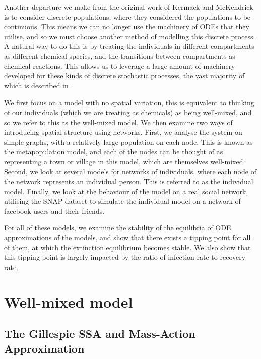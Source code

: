 \documentclass[12pt,a4paper,openany,twoside]{book}
\begin{document}
Another departure we make from the original work of Kermack and McKendrick is to consider discrete populations, where they considered the populations to be continuous. This means we can no longer use the machinery of ODEs that they utilise, and so we must choose another method of modelling this discrete process. A natural way to do this is by treating the individuals in different compartments as different chemical species, and the transitions between compartments as chemical reactions. This allows us to leverage a large amount of machinery developed for these kinds of discrete stochastic processes, the vast majority of which is described in \citet{erbanStochasticModellingReaction2019}.

We first focus on a model with no spatial variation, this is equivalent to thinking of our individuals (which we are treating as chemicals) as being well-mixed, and so we refer to this as the well-mixed model. We then examine two ways of introducing spatial structure using networks. First, we analyse the system on simple graphs, with a relatively large population on each node. This is known as the metapopulation model, and each of the nodes can be thought of as representing a town or village in this model, which are themselves well-mixed. Second, we look at several models for networks of individuals, where each node of the network represents an individual person. This is referred to as the individual model. Finally, we look at the behaviour of the model on a real social network, utilising the SNAP dataset \citep{snapnets} to simulate the individual model on a network of facebook users and their friends.

For all of these models, we examine the stability of the equilibria of ODE approximations of the models, and show that there exists a tipping point for all of them, at which the extinction equilibrium becomes stable. We also show that this tipping point is largely impacted by the ratio of infection rate to recovery rate.


\chapter{Well-mixed model}

\section{The Gillespie SSA and Mass-Action Approximation}
\end{document}
